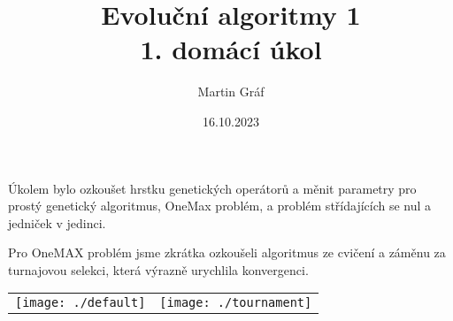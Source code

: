 \documentclass[a4paper]{article}
\newenvironment{ukol}[2][]{\begin{trivlist} 
\item[\hskip \labelsep {\bfseries #1}\hskip \labelsep {\bfseries #2}]}{\end{trivlist}}
\begin{document}
 
 
\title{ Evoluční algoritmy 1 \\ 1. domácí úkol
        } 
\author{Martin Gráf}
\date{16.10.2023}

\maketitle

Úkolem bylo ozkoušet hrstku genetických operátorů a měnit parametry pro prostý genetický algoritmus, OneMax problém, a problém střídajících se nul a jedniček v jedinci.

\begin{ukol}{OneMAX}

Pro OneMAX problém jsme zkrátka ozkoušeli algoritmus ze cvičení a záměnu za turnajovou selekci, která výrazně urychlila konvergenci.


	\begin{center}
		\begin{tabular}{ c c }
		 \texttt{[image: ./default]} & \texttt{[image: ./tournament]} \\ 
		\end{tabular}
	\end{center}

\end{ukol}
\end{document}
